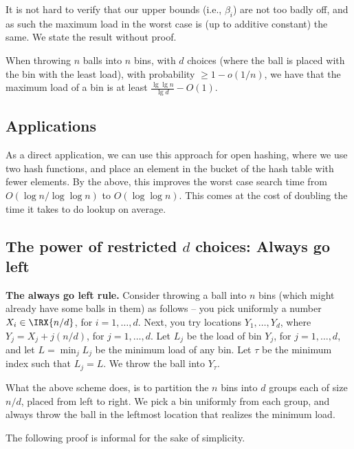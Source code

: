 It is not hard to verify that our upper bounds (i.e., $\beta_i$) are
not too badly off, and as such the maximum load in the worst case is
(up to additive constant) the same. We state the result without proof.

\begin{theorem}
    When throwing $n$ balls into $n$ bins, with $d$ choices (where the
    ball is placed with the bin with the least load), with probability
    $\geq 1-o(1/n)$, we have that the maximum load of a bin is at
    least $\tfrac{\lg \lg n}{\lg d} - O(1)$.
\end{theorem}

\subsection{Applications}

As a direct application, we can use this approach for open hashing,
where we use two hash functions, and place an element in the bucket of
the hash table with fewer elements. By the above, this improves the
worst case search time from $O( \log n / \log \log n)$ to
$O( \log \log n)$. This comes at the cost of doubling the time it
takes to do lookup on average.



\subsection{The power of restricted $d$ choices: %
   Always go left}
%

\noindent%
\textbf{The always go left rule.} %
Consider throwing a ball into $n$ bins (which might already have some
balls in them) as follows -- you pick uniformly a number
$X_i \in \IRX{n/d}$, for $i=1,\ldots, d$. Next, you try locations
$Y_1, \ldots, Y_d$, where $Y_j = X_j + j(n/d)$, for $j=1,\ldots,
d$. Let $L_j$ be the load of bin $Y_j$, for $j=1,\ldots, d$, and let
$L = \min_j L_j$ be the minimum load of any bin. Let $\tau$ be the
minimum index such that $L_j = L$. We throw the ball into $Y_\tau$.

What the above scheme does, is to partition the $n$ bins into $d$
groups each of size $n/d$, placed from left to right. We pick a bin
uniformly from each group, and always throw the ball in the leftmost
location that realizes the minimum load.

The following proof is informal for the sake of simplicity.

